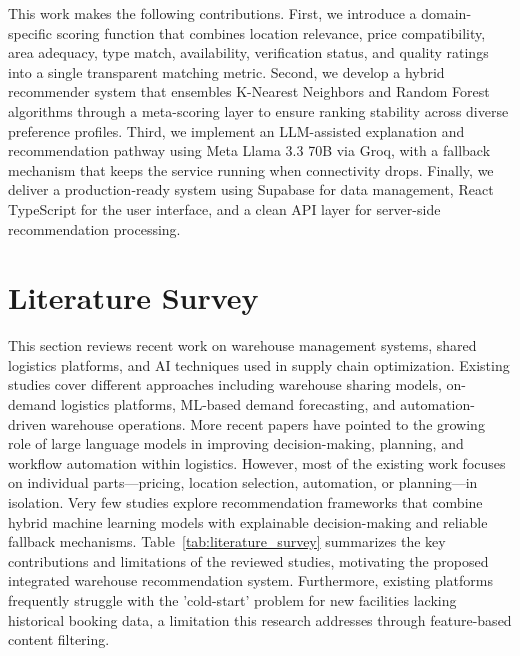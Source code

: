 \documentclass[conference]{IEEEtran}
\begin{document}
This work makes the following contributions. First, we introduce a domain-specific scoring function that combines location relevance, price compatibility, area adequacy, type match, availability, verification status, and quality ratings into a single transparent matching metric. Second, we develop a hybrid recommender system that ensembles K-Nearest Neighbors and Random Forest algorithms through a meta-scoring layer to ensure ranking stability across diverse preference profiles. Third, we implement an LLM-assisted explanation and recommendation pathway using Meta Llama 3.3 70B via Groq, with a fallback mechanism that keeps the service running when connectivity drops. Finally, we deliver a production-ready system using Supabase for data management, React TypeScript for the user interface, and a clean API layer for server-side recommendation processing.

\section{Literature Survey}
This section reviews recent work on warehouse management systems, shared logistics platforms, and AI techniques used in supply chain optimization. Existing studies cover different approaches including warehouse sharing models, on-demand logistics platforms, ML-based demand forecasting, and automation-driven warehouse operations. More recent papers have pointed to the growing role of large language models in improving decision-making, planning, and workflow automation within logistics. However, most of the existing work focuses on individual parts---pricing, location selection, automation, or planning---in isolation. Very few studies explore recommendation frameworks that combine hybrid machine learning models with explainable decision-making and reliable fallback mechanisms. Table~\ref{tab:literature_survey} summarizes the key contributions and limitations of the reviewed studies, motivating the proposed integrated warehouse recommendation system. Furthermore, existing platforms frequently struggle with the 'cold-start' problem for new facilities lacking historical booking data, a limitation this research addresses through feature-based content filtering.
\end{document}

